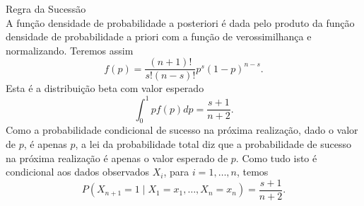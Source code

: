 \begin{frame}[allowframebreaks]
\begin{block}{Regra da Sucessão}
\begin{equation}
        \end{equation}
  \blockbreak
  A função densidade de probabilidade a posteriori é dada pelo produto da função densidade de probabilidade a priori com a 
  função de verossimilhança e normalizando. Teremos assim
        \begin{equation}
	f(p) = \frac{(n+1)!}{s! (n-s)!} p^s (1-p)^{n-s} .
        \end{equation}
  Esta é a distribuição beta com valor esperado
        \begin{equation}
	\int_0^1 p f(p) dp = \frac{s+1}{n+2} .
        \end{equation} 
  \blockbreak
  Como a probabilidade condicional de sucesso na próxima realização, dado o valor de $p$, é apenas $p$, a lei da probabilidade total
  diz que a probabilidade de sucesso na próxima realização é apenas o valor esperado de $p$. Como tudo isto é condicional aos dados
  observados $X_i$, para $i=1,\ldots,n$, temos
        \begin{equation}
	P(X_{n+1} = 1 \mid X_1 = x_1, \ldots, X_n = x_n ) = \frac{s + 1}{n + 2} .
        \end{equation}
  \end{block}

\end{frame}
